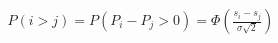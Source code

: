 \documentclass[preview]{standalone}
\begin{document}
\begin{align*}
P(i > j) = P(P_i - P_j > 0) = \Phi\left(\frac{s_i-s_j}{\sigma\sqrt{2}}\right)
\end{align*}
\end{document}
